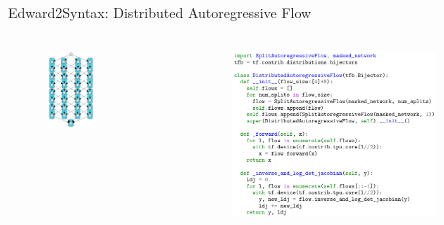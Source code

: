 \documentclass[AERbeamer%
              ,optEnglish%
              ,optBiber%
              ,optBibstyleAlphabetic%
              ,optBeamerClassicFormat%
              ]{AERlatex}%
\begin{document}
\begin{frame}[c]{Edward2}{Syntax: Distributed Autoregressive Flow}
    \centering
    \begin{columns}[T]
        \begin{column}{0.44\textwidth}
            \centering
            \begin{figure}
                \centering
                \includegraphics[width=0.55\textwidth]{Edward2Distributed.png}
            \end{figure}
        \end{column}
        \begin{column}{0.56\textwidth}
            \centering
            \begin{figure}
                \centering
                \includegraphics[width=0.85\textwidth]{Edward2Syntax.png}
            \end{figure}
        \end{column}
    \end{columns}
\end{frame}
\end{document}
